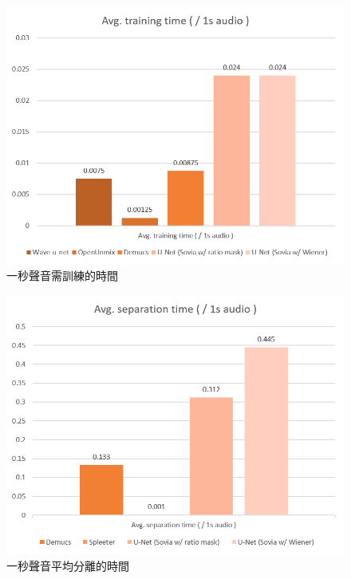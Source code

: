 \begin{figure}[htbp]
    \hfil
    \begin{minipage}[t]{0.60\textwidth}
        \includegraphics[width=\textwidth]{./figures/chapter06_conclusions/pic_conclusions1.png}
        \caption {一秒聲音需訓練的時間}
        \label{pic_conclusions1}
    \end{minipage}
    \hfil
\end{figure}

\begin{figure}[htbp]
    \hfil
    \begin{minipage}[t]{0.60\textwidth}
        \includegraphics[width=\textwidth]{./figures/chapter06_conclusions/pic_conclusions2.png}
        \caption {一秒聲音平均分離的時間}
        \label{pic_conclusions2}
    \end{minipage}
    \hfil
\end{figure}